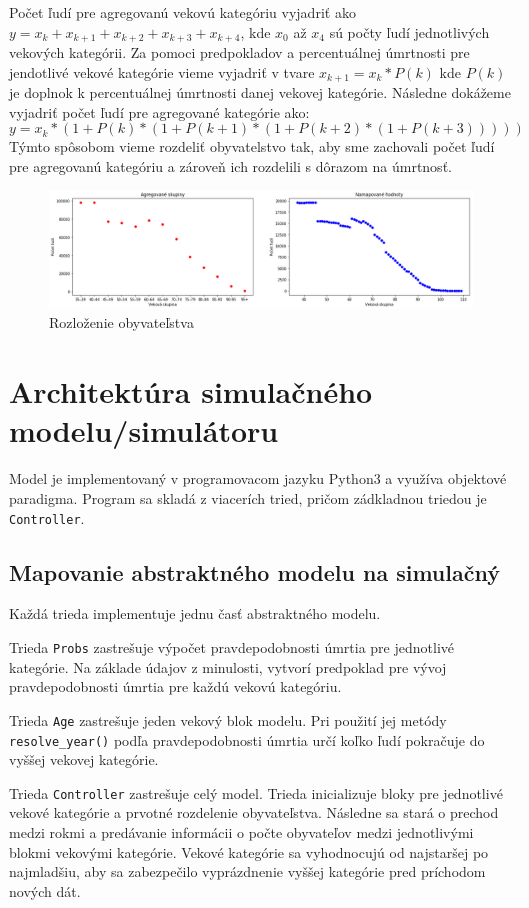\documentclass[a4paper, 11pt]{article}
\begin{document}
Počet ľudí pre agregovanú vekovú kategóriu vyjadriť ako $y = x_{k} + x_{k+1} + x_{k+2} + x_{k+3} + x_{k+4}$, kde $x_0$ až $x_4$ sú počty ľudí jednotlivých vekových kategórii. Za pomoci predpokladov a percentuálnej úmrtnosti pre jendotlivé vekové kategórie vieme vyjadriť v tvare $x_{k+1}=x_{k}*P(k)$ kde $P(k)$ je doplnok k percentuálnej úmrtnosti danej vekovej kategórie. Následne dokážeme vyjadriť počet ľudí pre agregované kategórie ako:
$$y = x_k*(1 + P(k)*(1 + P(k+1)*(1 + P(k+2) * (1 + P(k+3)))))$$
Týmto spôsobom vieme rozdeliť obyvatelstvo tak, aby sme zachovali počet ľudí pre agregovanú kategóriu a zároveň ich rozdelili s dôrazom na úmrtnosť.
\begin{figure}[H]
\centering
\includegraphics[width=1\textwidth]{exp_3}
\caption{Rozloženie obyvateľstva}
\end{figure}

\section{Architektúra simulačného modelu/simulátoru}
Model je implementovaný v programovacom jazyku Python3 a využíva objektové paradigma. Program sa skladá z viacerích tried, pričom zádkladnou triedou je \texttt{Controller}.

\subsection{Mapovanie abstraktného modelu na simulačný}
Každá trieda implementuje jednu časť abstraktného modelu.

Trieda \texttt{Probs} zastrešuje výpočet pravdepodobnosti úmrtia pre jednotlivé kategórie. Na základe údajov z minulosti, vytvorí predpoklad pre vývoj pravdepodobnosti úmrtia pre každú vekovú kategóriu.

Trieda \texttt{Age} zastrešuje jeden vekový blok modelu. Pri použití jej metódy \texttt{resolve\_year()} podľa pravdepodobnosti úmrtia určí koľko ľudí pokračuje do vyššej vekovej kategórie.

Trieda \texttt{Controller} zastrešuje celý model. Trieda inicializuje bloky pre jednotlivé vekové kategórie a prvotné rozdelenie obyvateľstva. Následne sa stará o prechod medzi rokmi a predávanie informácii o počte obyvateľov medzi jednotlivými blokmi vekovými kategórie. Vekové kategórie sa vyhodnocujú od najstaršej po najmladšiu, aby sa zabezpečilo vyprázdnenie vyššej kategórie pred príchodom nových dát.
\end{document}
